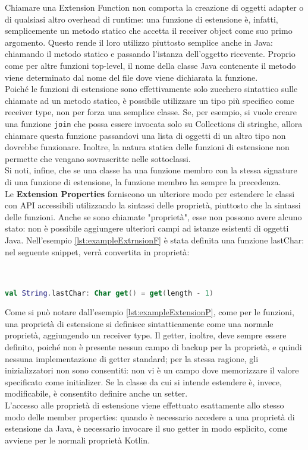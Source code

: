 Chiamare una Extension Function non comporta la creazione di oggetti adapter o di qualsiasi altro overhead di runtime: una funzione di estensione è, infatti, semplicemente un metodo statico che accetta il receiver object come suo primo argomento. Questo rende il loro utilizzo piuttosto semplice anche in Java: chiamando il metodo statico e passando l'istanza dell'oggetto ricevente. Proprio come per altre funzioni top-level, il nome della classe Java contenente il metodo viene determinato dal nome del file dove viene dichiarata la funzione.\\
Poiché le funzioni di estensione sono effettivamente solo zucchero sintattico sulle chiamate ad un metodo statico, è possibile utilizzare un tipo più specifico come receiver type, non per forza una semplice classe. Se, per esempio, si vuole creare una funzione \texttt{join} che possa essere invocata solo su Collections di stringhe, allora chiamare questa funzione passandovi una lista di oggetti di un altro tipo non dovrebbe funzionare. Inoltre, la natura statica delle funzioni di estensione non permette che vengano sovrascritte nelle sottoclassi.\\
Si noti, infine, che se una classe ha una funzione membro con la stessa signature di una funzione di estensione, la funzione membro ha sempre la precedenza.\\

Le {\bfseries Extension Properties} forniscono un ulteriore modo per estendere le classi con API accessibili utilizzando la sintassi delle proprietà, piuttosto che la sintassi delle funzioni. Anche se sono chiamate "proprietà", esse non possono avere alcuno stato: non è possibile aggiungere ulteriori campi ad istanze esistenti di oggetti Java. Nell'esempio \ref{lst:exampleExtrnsionF} è stata definita una funzione lastChar: nel seguente snippet, verrà convertita in proprietà:\\
\\
\\

\begin{lstlisting}[caption={Definizione di una Extension Property}, captionpos=b, label={lst:exampleExtensionP}, language=Kotlin]
val String.lastChar: Char get() = get(length - 1)
\end{lstlisting}

Come si può notare dall'esempio \ref{lst:exampleExtensionP}, come per le funzioni, una proprietà di estensione si definisce sintatticamente come una normale proprietà, aggiungendo un receiver type. Il getter, inoltre, deve sempre essere definito, poiché non è presente nessun campo di backup per la proprietà, e quindi nessuna implementazione di getter standard; per la stessa ragione, gli inizializzatori non sono consentiti: non vi è un campo dove memorizzare il valore specificato come initializer. Se la classe da cui si intende estendere è, invece, modificabile, è consentito definire anche un setter.\\
L'accesso alle proprietà di estensione viene effettuato esattamente allo stesso modo delle member properties: quando è necessario accedere a una proprietà di estensione da Java, è necessario invocare il suo getter in modo esplicito, come avviene per le normali proprietà Kotlin.\\

